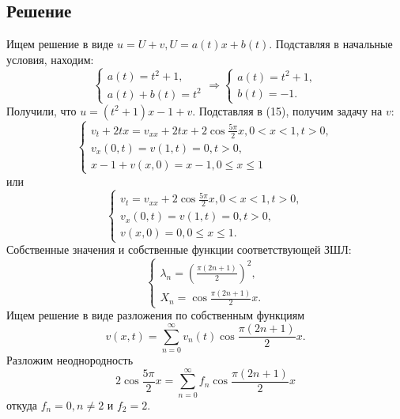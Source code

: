 \documentclass[11pt]{article}
\begin{document}
\subsection{Решение}
\label{sec:orge7aed81}
Ищем решение в виде $u = U + v, U = a(t)x + b(t)$. Подставляя в начальные условия, находим:
\begin{equation*}
\begin{cases}
a(t) = t^2 + 1, \\
a(t) + b(t) = t^2
\end{cases}
\Rightarrow
\begin{cases}
a(t) = t^2 + 1, \\
b(t) = -1.
\end{cases}
\end{equation*}
Получили, что $u = (t^2 + 1)x - 1 + v$. Подставляя в (15), получим задачу на $v$:
\begin{equation*}
\begin{cases}
v_t + 2tx = v_{xx} + 2tx + 2\cos\frac{5\pi}2x, 0 < x < 1, t > 0, \\
v_x(0, t) = v(1, t) = 0, t > 0, \\
x - 1 + v(x, 0) = x - 1, 0 \leq x \leq 1
\end{cases}
\end{equation*}
или
\begin{equation}
\begin{cases}
v_t = v_{xx} + 2\cos\frac{5\pi}2x, 0 < x < 1, t > 0, \\
v_x(0, t) = v(1, t) = 0, t > 0, \\
v(x, 0) = 0, 0 \leq x \leq 1.
\end{cases}
\end{equation}
Собственные значения и собственные функции соответствующей ЗШЛ:
\begin{equation*}
\begin{cases}
\lambda_n = \left(\frac{\pi(2n + 1)}2\right)^2, \\
X_n = \cos\frac{\pi(2n + 1)}2x.
\end{cases}
\end{equation*}
Ищем решение в виде разложения по собственным функциям
\begin{equation*}
v(x, t) = \sum_{n = 0}^{\infty}v_n(t)\cos\frac{\pi(2n + 1)}2x.
\end{equation*}
Разложим неоднородность
\begin{equation*}
2\cos\frac{5\pi}2x = \sum_{n = 0}^{\infty}f_n\cos\frac{\pi(2n + 1)}2x
\end{equation*}
откуда $f_n = 0, n \neq 2$ и $f_2 = 2$.
\end{document}
